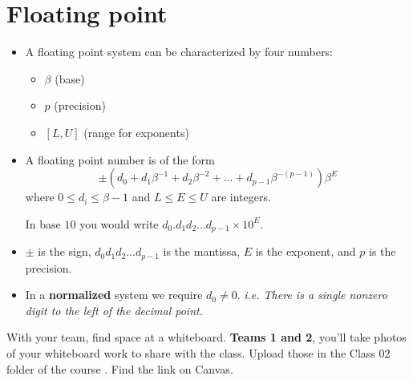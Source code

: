\documentclass[12pt,letterpaper,noanswers]{exam}
\begin{document}





\section{Floating point}

\begin{tcolorbox}
\begin{itemize}
    \item A floating point system can be characterized by four numbers:
\begin{itemize}
\itemsep0pt
    \item $\beta$ (base)
    \item $p$ (precision)
    \item $[L,U]$ (range for exponents)
\end{itemize}

\item A floating point number is of the form \[ \pm \left(d_0 + d_1\beta^{-1} + d_2 \beta^{-2} + ... + d_{p-1}\beta^{-(p-1)}\right) \beta^E\] where $0\leq d_i\leq \beta-1$ and $L\leq E \leq U$ are integers.

In base $10$ you would write $d_0.d_1d_2...d_{p-1} \times 10^E$.
\item $\pm$ is the sign, $d_0d_1d_2...d_{p-1}$ is the mantissa, $E$ is the exponent, and $p$ is the precision.
\item In a \textbf{normalized} system we require $d_0\neq 0$. \emph{i.e. There is a single nonzero digit to the left of the decimal point.}
\end{itemize}
\end{tcolorbox}

With your team, find space at a whiteboard. \textbf{Teams 1 and 2}, you'll take photos of your whiteboard work to share with the class.  Upload those in the Class 02 folder of the course \href{Google Drive}{}.  Find the link on Canvas.  
\end{document}
